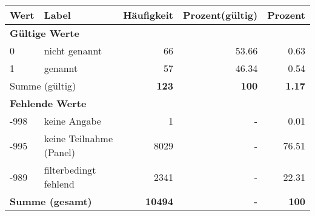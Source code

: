      \begin{longtable}{lXrrr}
     \toprule
     \textbf{Wert} & \textbf{Label} & \textbf{Häufigkeit} & \textbf{Prozent(gültig)} & \textbf{Prozent} \\
     \endhead
     \midrule
     \multicolumn{5}{l}{\textbf{Gültige Werte}}\\

     0 &
     \multicolumn{1}{X}{ nicht genannt   } &


       \num{66} &
       \num[round-mode=places,round-precision=2]{53,66} &
         \num[round-mode=places,round-precision=2]{0,63} \\

     1 &
     \multicolumn{1}{X}{ genannt   } &


       \num{57} &
       \num[round-mode=places,round-precision=2]{46,34} &
         \num[round-mode=places,round-precision=2]{0,54} \\
     \midrule
     \multicolumn{2}{l}{Summe (gültig)} &
       \textbf{\num{123}} &
     \textbf{100} &
       \textbf{\num[round-mode=places,round-precision=2]{1,17}} \\
     \multicolumn{5}{l}{\textbf{Fehlende Werte}}\\
       -998 &
       keine Angabe &
         \num{1} &
        - &
         \num[round-mode=places,round-precision=2]{0,01} \\
       -995 &
       keine Teilnahme (Panel) &
         \num{8029} &
        - &
         \num[round-mode=places,round-precision=2]{76,51} \\
       -989 &
       filterbedingt fehlend &
         \num{2341} &
        - &
         \num[round-mode=places,round-precision=2]{22,31} \\
     \midrule
     \multicolumn{2}{l}{\textbf{Summe (gesamt)}} &
          \textbf{\num{10494}} &
        \textbf{-} &
        \textbf{100} \\
     \bottomrule
     \end{longtable}
     
